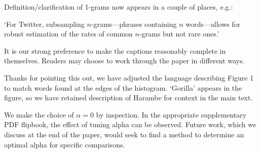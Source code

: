 Definition/clarification of 1-grams now appears in a couple of places, e.g.:

`For Twitter, subsampling $n$-grams---phrases containing $n$ words---allows for robust estimation of the rates of common $n$-grams but not rare ones.'








It is our strong preference to make the captions reasonably complete in themselves. Readers may choose to work through the paper in different ways.


Thanks for pointing this out, we have adjusted the language describing Figure 1 to match words found at the edges of the histogram. `Gorilla' appears in the figure, so we have retained description of Harambe for context in the main text.



We make the choice of $\alpha = 0$ by inspection.
In the appropriate supplementary PDF flipbook, the effect of tuning alpha can be observed.
Future work, which we discuss at the end of the paper, would seek to find
a method to determine an optimal alpha for specific comparisons.



